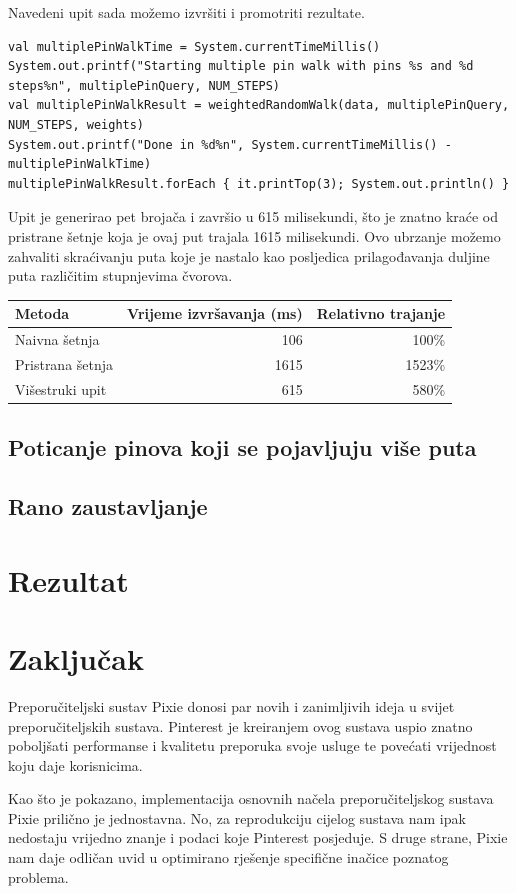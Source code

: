 \documentclass[times, utf8, seminar]{fer}
\begin{document}
Navedeni upit sada možemo izvršiti i promotriti rezultate.

\begin{lstlisting}
val multiplePinWalkTime = System.currentTimeMillis()
System.out.printf("Starting multiple pin walk with pins %s and %d steps%n", multiplePinQuery, NUM_STEPS)
val multiplePinWalkResult = weightedRandomWalk(data, multiplePinQuery, NUM_STEPS, weights)
System.out.printf("Done in %d%n", System.currentTimeMillis() - multiplePinWalkTime)
multiplePinWalkResult.forEach { it.printTop(3); System.out.println() }
\end{lstlisting}

Upit je generirao pet brojača i završio u 615 milisekundi, što je znatno kraće od pristrane šetnje koja je ovaj put trajala 1615 milisekundi. Ovo ubrzanje možemo zahvaliti skraćivanju puta koje je nastalo kao posljedica prilagođavanja duljine puta različitim stupnjevima čvorova.

\begin{center}
		  \begin{tabular}{ |l|r|r| }
					 \hline
					 Metoda & Vrijeme izvršavanja (ms) & Relativno trajanje\\
					 \hline
					 Naivna šetnja & 106 & 100\% \\
					 \hline
					 Pristrana šetnja & 1615 & 1523\% \\
					 \hline
					 Višestruki upit & 615 & 580\% \\
					 \hline
		  \end{tabular}
\end{center}

\section{Poticanje pinova koji se pojavljuju više puta}

\section{Rano zaustavljanje}

\chapter{Rezultat}

\chapter{Zaključak}

Preporučiteljski sustav Pixie donosi par novih i zanimljivih ideja u svijet preporučiteljskih sustava. Pinterest je kreiranjem ovog sustava uspio znatno poboljšati performanse i kvalitetu preporuka svoje usluge te povećati vrijednost koju daje korisnicima.

Kao što je pokazano, implementacija osnovnih načela preporučiteljskog sustava Pixie prilično je jednostavna. No, za reprodukciju cijelog sustava nam ipak nedostaju vrijedno znanje i podaci koje Pinterest posjeduje. S druge strane, Pixie nam daje odličan uvid u optimirano rješenje specifične inačice poznatog problema.



\end{document}
